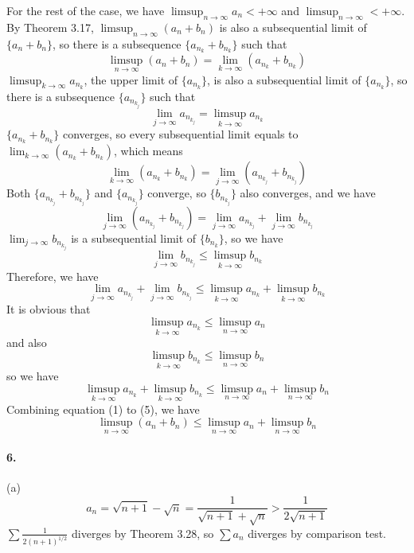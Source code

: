 \documentclass[a4paper]{article}
\begin{document}
For the rest of the case, we have $\limsup_{n\to\infty}a_n<+\infty$ and $\limsup_{n\to\infty}<+\infty$. By Theorem 3.17, $\limsup_{n\to\infty}(a_n+b_n)$ is also a subsequential limit of $\{a_n+b_n\}$, so there is a subsequence $\{a_{n_k}+b_{n_k}\}$ such that 
\begin{equation}
    \limsup_{n\to\infty}(a_n+b_n)=\lim_{k\to\infty}(a_{n_k}+b_{n_k})
\end{equation}
$\limsup_{k\to\infty}a_{n_k}$, the upper limit of $\{a_{n_k}\}$, is also a subsequential limit of $\{a_{n_k}\}$, so there is a subsequence $\{a_{n_{k_j}}\}$ such that
\[
\lim_{j\to\infty}a_{n_{k_{j}}}=\limsup_{k\to\infty}a_{n_k}
\]
$\{a_{n_k}+b_{n_k}\}$ converges, so every subsequential limit equals to $\lim_{k\to\infty}(a_{n_k}+b_{n_k})$, which means
\begin{equation}
    \lim_{k\to\infty}(a_{n_k}+b_{n_k})=\lim_{j\to\infty}(a_{n_{k_j}}+b_{n_{k_j}})
\end{equation}
Both $\{a_{n_{k_j}}+b_{n_{k_j}}\}$ and $\{a_{n_{k_j}}\}$ converge, so $\{b_{n_{k_j}}\}$ also converges, and we have
\begin{equation}
    \lim_{j\to\infty}(a_{n_{k_j}}+b_{n_{k_j}})=\lim_{j\to\infty}a_{n_{k_j}}+\lim_{j\to\infty}b_{n_{k_j}}
\end{equation}
$\lim_{j\to\infty}b_{n_{k_j}}$ is a subsequential limit of $\{b_{n_k}\}$, so we have
\[
\lim_{j\to\infty}b_{n_{k_j}}\leq\limsup_{k\to\infty}b_{n_k}
\]
Therefore, we have
\begin{equation}
    \lim_{j\to\infty}a_{n_{k_j}}+\lim_{j\to\infty}b_{n_{k_j}}\leq\limsup_{k\to\infty}a_{n_k}+\limsup_{k\to\infty}b_{n_k}
\end{equation}
It is obvious that 
\[
\limsup_{k\to\infty}a_{n_k}\leq \limsup_{n\to\infty}a_n
\]
and also
\[
\limsup_{k\to\infty}b_{n_k}\leq \limsup_{n\to\infty}b_n
\]
so we have
\begin{equation}
    \limsup_{k\to\infty}a_{n_k}+\limsup_{k\to\infty}b_{n_k}\leq\limsup_{n\to\infty}a_n+\limsup_{n\to\infty}b_n
\end{equation}
Combining equation (1) to (5), we have
\[
\limsup_{n\to\infty}(a_n+b_n)\leq\limsup_{n\to\infty}a_n+\limsup_{n\to\infty}b_n
\]

\paragraph{6.}
(a)
\[
a_n=\sqrt{n+1}-\sqrt{n}=\frac{1}{\sqrt{n+1}+\sqrt{n}}>\frac{1}{2\sqrt{n+1}}
\]
$\sum\frac{1}{2(n+1)^{1/2}}$ diverges by Theorem 3.28, so $\sum a_n$ diverges by comparison test.
\medskip
\end{document}
